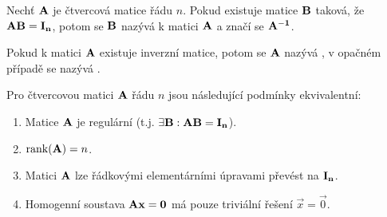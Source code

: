 \begin{definition}
    Nechť $\mathbf{A}$ je čtvercová matice řádu $n$. Pokud existuje matice
    $\mathbf{B}$ taková, že $\mathbf{A}\mathbf{B} = \mathbf{I_n}$, potom se $\mathbf{B}$
    nazývá  k matici $\mathbf{A}$ a značí se
    $\mathbf{A^{-1}}$.

    Pokud k matici $\mathbf{A}$ existuje inverzní matice, potom se $\mathbf{A}$
    nazývá , v opačném případě se nazývá
    .
\end{definition}

\begin{theorem}
    Pro čtvercovou matici $\mathbf{A}$ řádu $n$ jsou následující podmínky
    ekvivalentní:
    \begin{enumerate}
        \item Matice $\mathbf{A}$ je regulární (t.j. $\exists \mathbf{B}: \mathbf{A}\mathbf{B}
            = \mathbf{I_n}$).
        \item $\mathop{\mathrm{rank}}(\mathbf{A}) = n$.
        \item Matici $\mathbf{A}$ lze řádkovými elementárními úpravami převést na
            $\mathbf{I_n}$.
        \item Homogenní soustava $\mathbf{A}\mathbf{x} = \mathbf{0}$ má pouze
            triviální řešení $\vec{x} = \vec{0}$.
    \end{enumerate}
\end{theorem}


